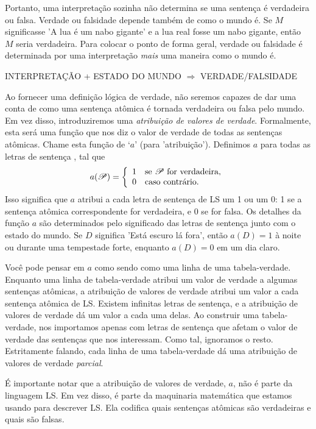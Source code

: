 Portanto, uma interpretação sozinha não determina se uma sentença é verdadeira ou falsa. Verdade ou falsidade depende também de como o mundo é. Se $M$ significasse 'A lua é um nabo gigante' e a lua real fosse um nabo gigante, então $M$ seria verdadeira. Para colocar o ponto de forma geral, verdade ou falsidade é determinada por uma interpretação \emph{mais} uma maneira como o mundo é.

\begin{center}
INTERPRETAÇÃO + ESTADO DO MUNDO $\Longrightarrow$ VERDADE/FALSIDADE
\end{center}

Ao fornecer uma definição lógica de verdade, não seremos capazes de dar uma conta de como uma sentença atômica é tornada verdadeira ou falsa pelo mundo. Em vez disso, introduziremos uma \emph{atribuição de valores de verdade}. Formalmente, esta será uma função que nos diz o valor de verdade de todas as sentenças atômicas. Chame esta função de `$a$' (para 'atribuição'). Definimos $a$ para todas as letras de sentença , tal que
\begin{displaymath}
a(\mathscr{P}) =
\left\{
	\begin{array}{ll}
	1 & \mbox{se \ensuremath{\mathscr{P}} for verdadeira},\\
	0 & \mbox{caso contrário.}
	\end{array}
\right.
\end{displaymath}
Isso significa que $a$ atribui a cada letra de sentença de LS um 1 ou um 0: 1 se a sentença atômica correspondente for verdadeira, e 0 se for falsa. Os detalhes da função $a$ são determinados pelo significado das letras de sentença junto com o estado do mundo. Se $D$ significa 'Está escuro lá fora', então $a(D)=1$ à noite ou durante uma tempestade forte, enquanto $a(D)=0$ em um dia claro.

Você pode pensar em $a$ como sendo como uma linha de uma tabela-verdade. Enquanto uma linha de tabela-verdade atribui um valor de verdade a algumas sentenças atômicas, a atribuição de valores de verdade atribui um valor a cada sentença atômica de LS. Existem infinitas letras de sentença, e a atribuição de valores de verdade dá um valor a cada uma delas. Ao construir uma tabela-verdade, nos importamos apenas com letras de sentença que afetam o valor de verdade das sentenças que nos interessam. Como tal, ignoramos o resto. Estritamente falando, cada linha de uma tabela-verdade dá uma atribuição de valores de verdade \emph{parcial}.

É importante notar que a atribuição de valores de verdade, $a$, não é parte da linguagem LS. Em vez disso, é parte da maquinaria matemática que estamos usando para descrever LS. Ela codifica quais sentenças atômicas são verdadeiras e quais são falsas.


